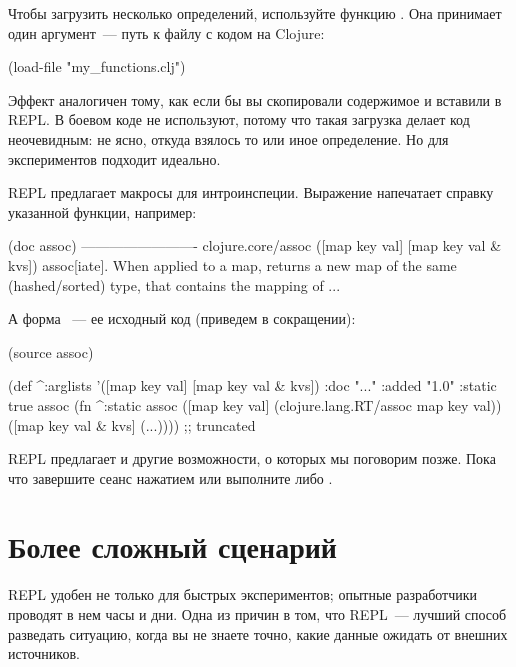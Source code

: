 Чтобы загрузить несколько определений, используйте функцию . Она принимает один аргумент~--- путь к файлу с кодом на Clojure:

\begin{english}
  \begin{clojure}
(load-file "my_functions.clj")
  \end{clojure}
\end{english}

Эффект аналогичен тому, как если бы вы скопировали содержимое и вставили в REPL. В боевом коде  не используют, потому что такая загрузка делает код неочевидным: не ясно, откуда взялось то или иное определение. Но для экспериментов  подходит идеально.

REPL предлагает макросы для интроинспеции. Выражение  напечатает справку указанной функции, например:

\begin{english}
  \begin{text}
(doc assoc)
-------------------------
clojure.core/assoc
([map key val] [map key val & kvs])
  assoc[iate]. When applied to a map, returns a new map
    of the same (hashed/sorted) type, that contains the
    mapping of ...
  \end{text}
\end{english}

А форма ~--- ее исходный код (приведем в сокращении):

\begin{english}
  \begin{clojure}
(source assoc)

(def
 ^{:arglists '([map key val] [map key val & kvs])
   :doc "..."
   :added "1.0"
   :static true}
 assoc
 (fn ^:static assoc
   ([map key val] (clojure.lang.RT/assoc map key val))
   ([map key val & kvs]
    (...)))) ;; truncated
  \end{clojure}
\end{english}

REPL предлагает и другие возможности, о которых мы поговорим позже. Пока что завершите сеанс нажатием  или выполните  либо .

\section{Более сложный сценарий}

REPL удобен не только для быстрых экспериментов; опытные разработчики проводят в нем часы и дни. Одна из причин в том, что REPL~--- лучший способ разведать ситуацию, когда вы не знаете точно, какие данные ожидать от внешних источников.


